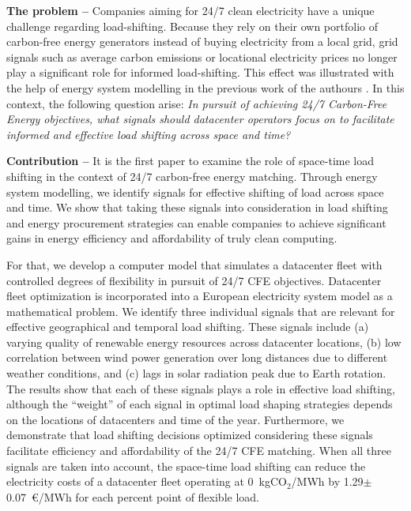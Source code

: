 \textbf{The problem --}
Companies aiming for 24/7 clean electricity have a unique challenge regarding load-shifting. Because they rely on their own portfolio of carbon-free energy generators instead of buying electricity from a local grid, grid signals such as average carbon emissions or locational electricity prices no longer play a significant role for informed load-shifting. This effect was illustrated with the help of energy system modelling in the previous work of the authours \cite{riepin-zenodo-systemlevel247,riepinMeansCostsSystemlevel2023}. In this context, the following question arise: \textit{In pursuit of achieving 24/7 Carbon-Free Energy objectives, what signals should datacenter operators focus on to facilitate informed and effective load shifting across space and time?}

\textbf{Contribution --} It is the first paper to examine the role of space-time load shifting in the context of 24/7 carbon-free energy matching.
Through energy system modelling, we identify signals for effective shifting of load across space and time. We show that taking these signals into consideration in load shifting and energy procurement strategies can enable companies to achieve significant gains in energy efficiency and affordability of truly clean computing.

For that, we develop a computer model that simulates a datacenter fleet with controlled degrees of flexibility in pursuit of 24/7 CFE objectives. Datacenter fleet optimization is incorporated into a European electricity system model as a mathematical problem.
We identify three individual signals that are relevant for effective geographical and temporal load shifting. These signals include (a) varying quality of renewable energy resources across datacenter locations, (b) low correlation between wind power generation over long distances due to different weather conditions, and (c) lags in solar radiation peak due to Earth rotation. The results show that each of these signals plays a role in effective load shifting, although the \enquote{weight} of each signal in optimal load shaping strategies depends on the locations of datacenters and time of the year.
Furthermore, we demonstrate that load shifting decisions optimized considering these signals facilitate efficiency and affordability of the 24/7 CFE matching. When all three signals are taken into account, the space-time load shifting can reduce the electricity costs of a datacenter fleet operating at 0~kgCO$_2$/MWh by 1.29$\pm$0.07~\euro/MWh for each percent point of flexible load.

